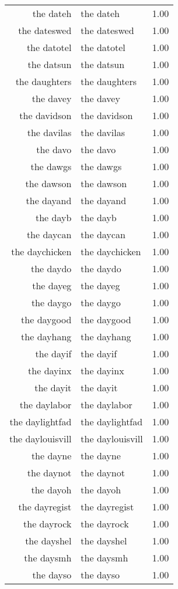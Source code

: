 \begin{table}[ht]
\begin{tabular}{rlr}
  the dateh & the dateh & 1.00 \\ 
  the dateswed & the dateswed & 1.00 \\ 
  the datotel & the datotel & 1.00 \\ 
  the datsun & the datsun & 1.00 \\ 
  the daughters & the daughters & 1.00 \\ 
  the davey & the davey & 1.00 \\ 
  the davidson & the davidson & 1.00 \\ 
  the davilas & the davilas & 1.00 \\ 
  the davo & the davo & 1.00 \\ 
  the dawgs & the dawgs & 1.00 \\ 
  the dawson & the dawson & 1.00 \\ 
  the dayand & the dayand & 1.00 \\ 
  the dayb & the dayb & 1.00 \\ 
  the daycan & the daycan & 1.00 \\ 
  the daychicken & the daychicken & 1.00 \\ 
  the daydo & the daydo & 1.00 \\ 
  the dayeg & the dayeg & 1.00 \\ 
  the daygo & the daygo & 1.00 \\ 
  the daygood & the daygood & 1.00 \\ 
  the dayhang & the dayhang & 1.00 \\ 
  the dayif & the dayif & 1.00 \\ 
  the dayinx & the dayinx & 1.00 \\ 
  the dayit & the dayit & 1.00 \\ 
  the daylabor & the daylabor & 1.00 \\ 
  the daylightfad & the daylightfad & 1.00 \\ 
  the daylouisvill & the daylouisvill & 1.00 \\ 
  the dayne & the dayne & 1.00 \\ 
  the daynot & the daynot & 1.00 \\ 
  the dayoh & the dayoh & 1.00 \\ 
  the dayregist & the dayregist & 1.00 \\ 
  the dayrock & the dayrock & 1.00 \\ 
  the dayshel & the dayshel & 1.00 \\ 
  the daysmh & the daysmh & 1.00 \\ 
  the dayso & the dayso & 1.00 \\ 

\end{tabular}
\end{table}
